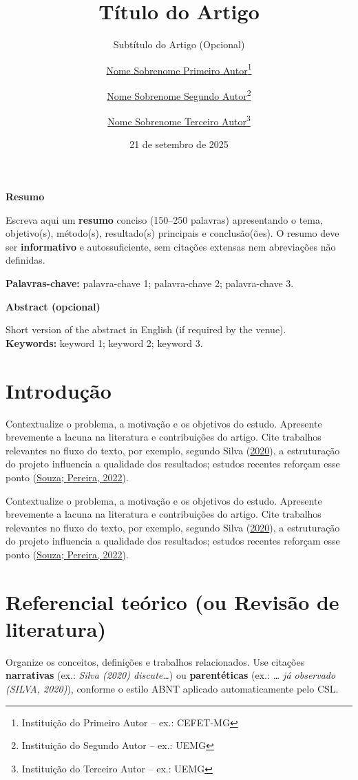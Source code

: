 \documentclass[
  12pt,
  a4paper,
]{article}
\title{Título do Artigo}
\subtitle{Subtítulo do Artigo (Opcional)}
\author{\href{mailto:author1@inst1.edu}{Nome Sobrenome Primeiro Autor}\thanks{Instituição do Primeiro Autor – ex.: CEFET-MG} \and \href{mailto:author2@inst2.edu}{Nome Sobrenome Segundo Autor}\thanks{Instituição do Segundo Autor – ex.: UEMG} \and \href{mailto:author3@inst3.edu}{Nome Sobrenome Terceiro Autor}\thanks{Instituição do Terceiro Autor – ex.: UEMG}}
\date{21 de setembro de 2025}
\begin{document}
\maketitle

\textbf{Resumo}

Escreva aqui um \textbf{resumo} conciso (150--250 palavras) apresentando
o tema, objetivo(s), método(s), resultado(s) principais e
conclusão(ões). O resumo deve ser \textbf{informativo} e
autossuficiente, sem citações extensas nem abreviações não definidas.

\textbf{Palavras-chave:} palavra-chave 1; palavra-chave 2; palavra-chave
3.

\textbf{Abstract (opcional)}

Short version of the abstract in English (if required by the venue).\\
\textbf{Keywords:} keyword 1; keyword 2; keyword 3.

\newpage

\hypertarget{introduuxe7uxe3o}{%
\section{Introdução}\label{introduuxe7uxe3o}}

Contextualize o problema, a motivação e os objetivos do estudo.
Apresente brevemente a lacuna na literatura e contribuições do artigo.
Cite trabalhos relevantes no fluxo do texto, por exemplo, segundo Silva
(\protect\hyperlink{ref-silva2020}{2020}), a estruturação do projeto
influencia a qualidade dos resultados; estudos recentes reforçam esse
ponto (\protect\hyperlink{ref-souza2022}{Souza; Pereira, 2022}).

Contextualize o problema, a motivação e os objetivos do estudo.
Apresente brevemente a lacuna na literatura e contribuições do artigo.
Cite trabalhos relevantes no fluxo do texto, por exemplo, segundo Silva
(\protect\hyperlink{ref-silva2020}{2020}), a estruturação do projeto
influencia a qualidade dos resultados; estudos recentes reforçam esse
ponto (\protect\hyperlink{ref-souza2022}{Souza; Pereira, 2022}).

\hypertarget{referencial-teuxf3rico-ou-revisuxe3o-de-literatura}{%
\section{Referencial teórico (ou Revisão de
literatura)}\label{referencial-teuxf3rico-ou-revisuxe3o-de-literatura}}

Organize os conceitos, definições e trabalhos relacionados. Use citações
\textbf{narrativas} (ex.: \emph{Silva (2020) discute\ldots{}}) ou
\textbf{parentéticas} (ex.: \emph{\ldots{} já observado (SILVA, 2020)}),
conforme o estilo ABNT aplicado automaticamente pelo CSL.
\end{document}
